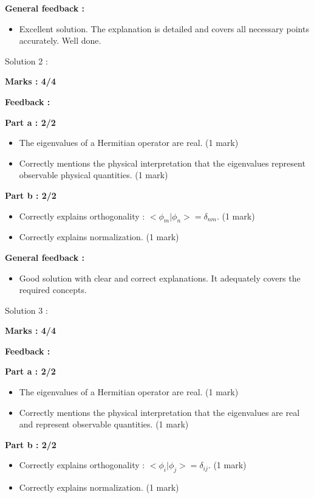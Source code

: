 \documentclass[a4paper,11pt]{article}
\begin{document}
\textbf{General feedback :}

\begin{itemize}
    \item Excellent solution. The explanation is detailed and covers all necessary points accurately. Well done.
\end{itemize}


Solution 2 : 

\textbf{Marks : 4/4}

\textbf{Feedback : }

\textbf{Part a : 2/2}

\begin{itemize}
    \item The eigenvalues of a Hermitian operator are real. (1 mark)
    \item Correctly mentions the physical interpretation that the eigenvalues represent observable physical quantities. (1 mark)
\end{itemize}


\textbf{Part b : 2/2}

\begin{itemize}
    \item Correctly explains orthogonality : $<\phi_m|\phi_n> = \delta_{nm}$. (1 mark)
    \item Correctly explains normalization. (1 mark)
\end{itemize}


\textbf{General feedback :}

\begin{itemize}
    \item Good solution with clear and correct explanations. It adequately covers the required concepts.
\end{itemize}


Solution 3 : 

\textbf{Marks : 4/4}

\textbf{Feedback : }

\textbf{Part a : 2/2}

\begin{itemize}
    \item The eigenvalues of a Hermitian operator are real. (1 mark)
    \item Correctly mentions the physical interpretation that the eigenvalues are real and represent observable quantities. (1 mark)
\end{itemize}


\textbf{Part b : 2/2}

\begin{itemize}
    \item Correctly explains orthogonality : $<\phi_i|\phi_j> = \delta_{ij}$. (1 mark)
    \item Correctly explains normalization. (1 mark)
\end{itemize}
\end{document}
